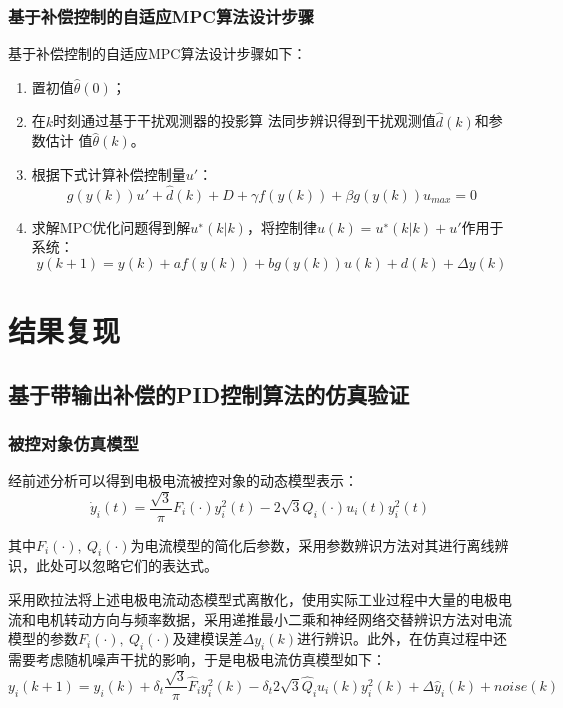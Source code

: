 \documentclass[UTF8, 12pt]{article}
\begin{document}
\subsubsection{基于补偿控制的自适应MPC算法设计步骤}
基于补偿控制的自适应MPC算法设计步骤如下：
\begin{enumerate}
	\item 置初值$\hat{\theta}(0)$；
	
	\item 在$k$时刻通过基于干扰观测器的投影算	法同步辨识得到干扰观测值$\hat{d}(k)$和参数估计	值$\hat{\theta}(k)$。
	
	\item 根据下式计算补偿控制量$u'$：
	\begin{equation*}
		[\hat{b}(k) + \beta]g(y(k))u' + \hat{d}(k) + D  + \gamma f(y(k)) + \beta g(y(k))u_{max} = 0
	\end{equation*}

	\item 求解MPC优化问题得到解$u^∗(k|k)$，将控制律$u(k) = u^∗(k|k) + u'$作用于系统：
	\begin{equation*}
		y(k+1) = y(k) + af(y(k)) + bg(y(k))u(k) + d(k) + \Delta y(k)
	\end{equation*}	
\end{enumerate}


%
\section{结果复现}


\subsection{基于带输出补偿的PID控制算法的仿真验证}
\subsubsection{被控对象仿真模型}
经前述分析可以得到电极电流被控对象的动态模型表示：
\begin{equation*}
	\dot{y}_i(t) = \frac{\sqrt{3}}{\pi}F_i(\cdot)y^2_i(t) - 2\sqrt{3}Q_i(\cdot)u_i(t)y_i^2(t)
\end{equation*}

其中$F_i(\cdot),\ Q_i(\cdot)$为电流模型的简化后参数，采用参数辨识方法对其进行离线辨识，此处可以忽略它们的表达式。

采用欧拉法将上述电极电流动态模型式离散化，使用实际工业过程中大量的电极电流和电机转动方向与频率数据，采用递推最小二乘和神经网络交替辨识方法对电流模型的参数$F_i(\cdot),\ Q_i(\cdot)$及建模误差$\Delta y_i(k)$进行辨识。此外，在仿真过程中还需要考虑随机噪声干扰的影响，于是电极电流仿真模型如下：
\begin{equation*}
	y_i(k+1) = y_i(k) + \delta_t \frac{\sqrt{3}}{\pi}\hat{F}_iy_i^2(k) - \delta_t2\sqrt{3}\hat{Q}_iu_i(k)y_i^2(k) + \Delta \hat{y}_i(k) + noise(k)
\end{equation*}
\end{document}
